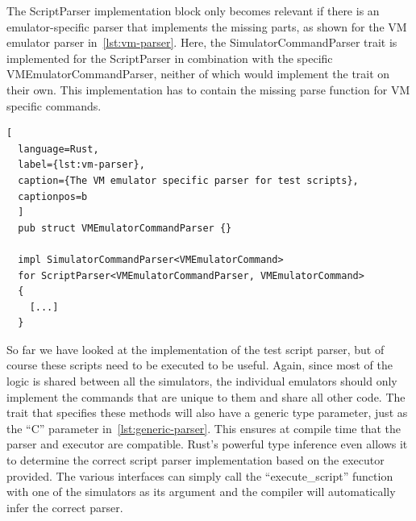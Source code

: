 The ScriptParser implementation block only becomes relevant if there is an emulator-specific parser that implements the missing parts, as shown for the VM emulator parser in~\cref{lst:vm-parser}.
Here, the SimulatorCommandParser trait is implemented for the ScriptParser in combination with the specific VMEmulatorCommandParser, neither of which would implement the trait on their own. This implementation has to contain the missing parse function for VM specific commands.

\begin{lstlisting}[
  language=Rust,
  label={lst:vm-parser},
  caption={The VM emulator specific parser for test scripts},
  captionpos=b
  ]
  pub struct VMEmulatorCommandParser {}

  impl SimulatorCommandParser<VMEmulatorCommand>
  for ScriptParser<VMEmulatorCommandParser, VMEmulatorCommand>
  {
    [...]
  }
\end{lstlisting}

So far we have looked at the implementation of the test script parser, but of course these scripts need to be executed to be useful.
Again, since most of the logic is shared between all the simulators, the individual emulators should only implement the commands that are unique to them and share all other code.
The trait that specifies these methods will also have a generic type parameter, just as the ``C'' parameter in~\cref{lst:generic-parser}. This ensures at compile time that the parser and executor are compatible.
Rust's powerful type inference even allows it to determine the correct script parser implementation based on the executor provided. The various interfaces can simply call the ``execute\_script'' function with one of the simulators as its argument and the compiler will automatically infer the correct parser.

